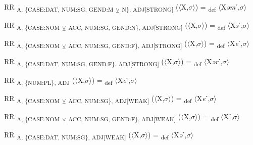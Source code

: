 {\begin{exe}
 RR \textsubscript{A, \{CASE:DAT, NUM:SG, GEND:M} \textsubscript{${\veebar}$}\textsubscript{ N\}, ADJ[STRONG]} ($\langle$X,$\sigma $$\rangle$) = \textsubscript{def} $\langle$X\textit{əm}ˊ,$\sigma $$\rangle$
\end{exe}

\begin{exe}
 RR \textsubscript{A, \{CASE:NOM} \textsubscript{${\veebar}$}\textsubscript{ ACC, NUM:SG, GEND:N\}, ADJ[STRONG]} ($\langle$X,$\sigma $$\rangle$) = \textsubscript{def} $\langle$X\textit{s}ˊ,$\sigma $$\rangle$
\end{exe}

\begin{exe}
 RR \textsubscript{A, \{CASE:NOM} \textsubscript{${\veebar}$}\textsubscript{ ACC, NUM:SG, GEND:F\}, ADJ[STRONG]} ($\langle$X,$\sigma $$\rangle$) = \textsubscript{def} $\langle$X\textit{e}ˊ,$\sigma $$\rangle$
\end{exe}

\begin{exe}
 RR \textsubscript{A, \{CASE:DAT, NUM:SG, GEND:F\}, ADJ[STRONG]} ($\langle$X,$\sigma $$\rangle$) = \textsubscript{def} $\langle$X\textit{ər}ˊ,$\sigma $$\rangle$
\end{exe}

\begin{exe}
 RR \textsubscript{A, \{NUM:PL\}, ADJ} ($\langle$X,$\sigma $$\rangle$) = \textsubscript{def} $\langle$X\textit{e}ˊ,$\sigma $$\rangle$
\end{exe}

\begin{exe}
 RR \textsubscript{A, \{CASE:NOM} \textsubscript{${\veebar}$}\textsubscript{ ACC, NUM:SG\}, ADJ[WEAK]} ($\langle$X,$\sigma $$\rangle$) = \textsubscript{def} $\langle$X\textit{e}ˊ,$\sigma $$\rangle$
\end{exe}

\begin{exe}
 RR \textsubscript{A, \{CASE:NOM} \textsubscript{${\veebar}$}\textsubscript{ ACC, NUM:SG, GEND:F\}, ADJ[WEAK]} ($\langle$X,$\sigma $$\rangle$) = \textsubscript{def} $\langle$Xˊ,$\sigma $$\rangle$
\end{exe}

\begin{exe}
 RR \textsubscript{A, \{CASE:DAT, NUM:SG\}, ADJ[WEAK]} ($\langle$X,$\sigma $$\rangle$) = \textsubscript{def} $\langle$X\textit{ə}ˊ,$\sigma $$\rangle$
\end{exe}

}
